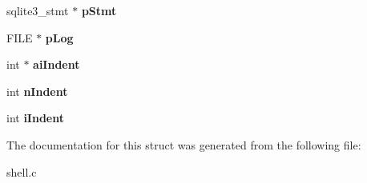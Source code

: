\begin{DoxyCompactItemize}
\item 
sqlite3\+\_\+stmt $\ast$ {\bfseries p\+Stmt}\hypertarget{structShellState_a443b930c7001c9b669728b917c2f5587}{}\label{structShellState_a443b930c7001c9b669728b917c2f5587}

\item 
F\+I\+LE $\ast$ {\bfseries p\+Log}\hypertarget{structShellState_a9ca42a0d7bf19e576de8ea13ba40b61c}{}\label{structShellState_a9ca42a0d7bf19e576de8ea13ba40b61c}

\item 
int $\ast$ {\bfseries ai\+Indent}\hypertarget{structShellState_a0481fdd4a0c88fb17f1a66ba87939ce9}{}\label{structShellState_a0481fdd4a0c88fb17f1a66ba87939ce9}

\item 
int {\bfseries n\+Indent}\hypertarget{structShellState_a73e3fe627474f4de6c0e04837ee0b0bd}{}\label{structShellState_a73e3fe627474f4de6c0e04837ee0b0bd}

\item 
int {\bfseries i\+Indent}\hypertarget{structShellState_a08d5d59ae0d44497aca79e89a5b8f0fe}{}\label{structShellState_a08d5d59ae0d44497aca79e89a5b8f0fe}

\end{DoxyCompactItemize}


The documentation for this struct was generated from the following file\+:\begin{DoxyCompactItemize}
\item 
shell.\+c\end{DoxyCompactItemize}
